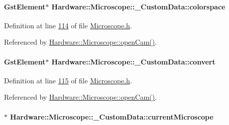 \paragraph[{colorspace}]{\setlength{\rightskip}{0pt plus 5cm}Gst\+Element$\ast$ Hardware\+::\+Microscope\+::\+\_\+\+Custom\+Data\+::colorspace}\label{struct_hardware_1_1_microscope_1_1___custom_data_ab745c37a5d761e71a8b60581d23284ec}


Definition at line \hyperlink{_microscope_8h_source_l00114}{114} of file \hyperlink{_microscope_8h_source}{Microscope.\+h}.



Referenced by \hyperlink{_microscope_8cpp_source_l00167}{Hardware\+::\+Microscope\+::open\+Cam()}.

\hypertarget{struct_hardware_1_1_microscope_1_1___custom_data_a6f1ebafe6122de462774fbe2d3d3e3bd}{}
\paragraph[{convert}]{\setlength{\rightskip}{0pt plus 5cm}Gst\+Element$\ast$ Hardware\+::\+Microscope\+::\+\_\+\+Custom\+Data\+::convert}\label{struct_hardware_1_1_microscope_1_1___custom_data_a6f1ebafe6122de462774fbe2d3d3e3bd}


Definition at line \hyperlink{_microscope_8h_source_l00115}{115} of file \hyperlink{_microscope_8h_source}{Microscope.\+h}.



Referenced by \hyperlink{_microscope_8cpp_source_l00167}{Hardware\+::\+Microscope\+::open\+Cam()}.

\hypertarget{struct_hardware_1_1_microscope_1_1___custom_data_a8356f8298aaff0788bac41d1746eaaba}{}
\paragraph[{current\+Microscope}]{$\ast$ Hardware\+::\+Microscope\+::\+\_\+\+Custom\+Data\+::current\+Microscope}\label{struct_hardware_1_1_microscope_1_1___custom_data_a8356f8298aaff0788bac41d1746eaaba}


